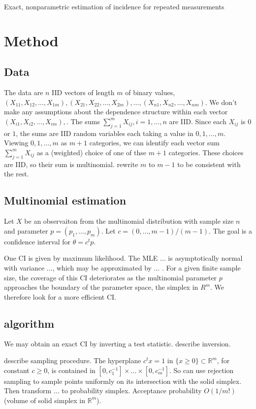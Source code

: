 \message{ !name(manuscript.tex)}\documentclass{article}
\newcommand{\x}X
\newcommand{\p}p
\newcommand{\n}n
\newcommand{\m}m
\renewcommand{\c}c
\begin{document}



Exact, nonparametric estimation of incidence for repeated measurements


\section{Method}

\subsection{Data}
The data are $n$ IID vectors of length
$m$ of binary values, 
$(\x_{11},\x_{12},\ldots,\x_{1m}), (\x_{21},\x_{22},\ldots,\x_{2m}), \ldots,
(\x_{n1},\x_{n2},\ldots,\x_{nm})$. We don't make any assumptions about
the dependence structure within each vector
$(\x_{i1},\x_{i2},\ldots,\x_{im}),$. The sums
$\sum_{j=1}^m\x_{ij}, i=1,\ldots,n$ are IID. Since each $\x_{ij}$ is $0$
or $1$, the sums are IID random variables each taking a value in
$0,1,\ldots,m$. Viewing $0,1,\ldots,m$ as $m+1$ categories, we can
identify each vector sum $\sum_{j=1}^m\x_{ij}$ as a (weighted) choice
of one of thse $m+1$ categories. These choices are IID, so their sum
is multinomial. rewrite $m$ to $m-1$ to be consistent with the rest.

\subsection{Multinomial estimation}

Let $\x$ be an observaiton from the multinomial distribution with
sample size $\n$ and parameter $\p=(\p_1,\ldots,\p_m)$. Let
$\c=(0,\ldots,\m-1)/(\m-1)$. The goal is a confidence interval for
$\theta=\c^t\p$.

One CI is given by maximum likelihood. The MLE ... is asymptotically
normal with variance ..., which may be approximated by ... . For a
given finite sample size, the coverage of this CI deteriorates as the
multinomial parameter $\p$ approaches the boundary of the parameter
space, the simplex in $R^m$. We therefore look for a more efficient
CI.


\subsection{algorithm}
We may obtain an exact CI by inverting a test statistic. describe inversion.

describe sampling procedure. The hyperplane $c^tx=1$ in $\{x\ge 0\}\subset\mathbb{R}^m$, for constant $c\ge 0$, is contained in $[0,c_1^{-1}]\times\ldots\times[0,c_m^{-1}]$. So can use rejection sampling to sample points uniformly on its intersection with the solid simplex. Then transform ... to probability simplex. Acceptance probability $O(1/m!)$ (volume of solid simplex in $\mathbb{R}^m$).
\end{document}
